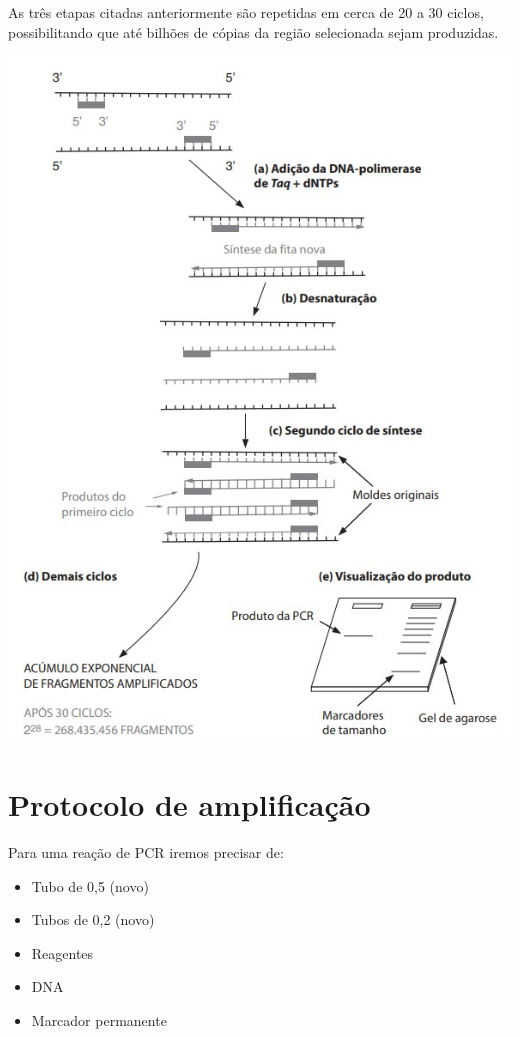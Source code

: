 \documentclass[
  letterpaper,
  DIV=11,
  numbers=noendperiod]{scrreprt}
\begin{document}
As três etapas citadas anteriormente são repetidas em cerca de 20 a 30
ciclos, possibilitando que até bilhões de cópias da região selecionada
sejam produzidas.

\includegraphics{figures/PCR.jpg}

\hfill\break

\hypertarget{protocolo-de-amplificauxe7uxe3o}{%
\section{\texorpdfstring{\textbf{Protocolo de
amplificação}}{Protocolo de amplificação}}\label{protocolo-de-amplificauxe7uxe3o}}

Para uma reação de PCR iremos precisar de:

\begin{itemize}
\item
  Tubo de 0,5 (novo)
\item
  Tubos de 0,2 (novo)
\item
  Reagentes
\item
  DNA
\item
  Marcador permanente
\end{itemize}
\end{document}
